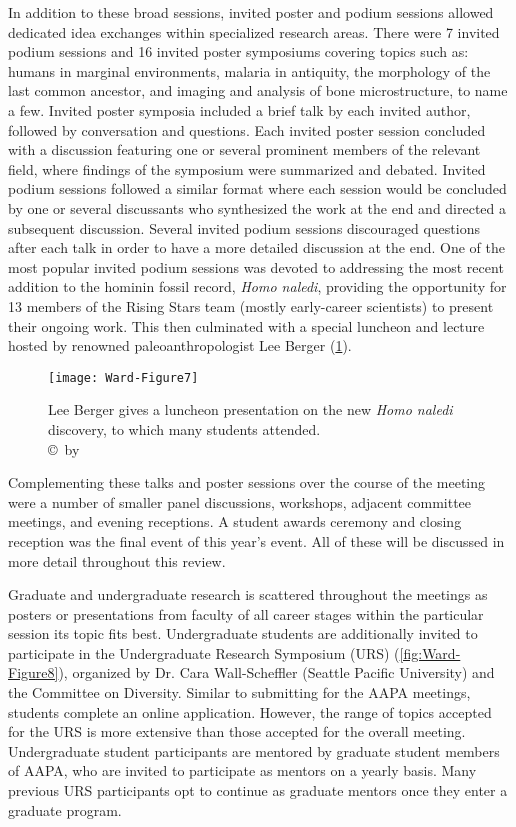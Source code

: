 \documentclass[english]{ijsra}
\begin{document}
In addition to these broad sessions, 
invited poster and podium sessions allowed dedicated idea exchanges within specialized research areas. 
There were 7 invited podium sessions and 16 invited poster symposiums covering topics such as: humans in marginal environments, 
malaria in antiquity, the morphology of the last common ancestor, and imaging and analysis of bone microstructure, to name a few. 
Invited poster symposia included a brief talk by each invited author, followed by conversation and questions. 
Each invited poster session concluded with a discussion featuring one or several prominent members of the relevant field,
where findings of the symposium were summarized and debated. 
Invited podium sessions followed a similar format where each session would be concluded by one or several discussants who synthesized
the work at the end and directed a subsequent discussion. 
Several invited podium sessions discouraged questions after each talk in order to have a more detailed discussion at the end.
One of the most popular invited podium sessions was devoted to addressing the most recent addition to the hominin fossil record,
\emph{Homo naledi}, providing the opportunity for 13 members of the Rising Stars team (mostly early-career scientists)
to present their ongoing work. 
This then culminated with a special luncheon and lecture hosted by renowned paleoanthropologist Lee Berger (\cref{fig:Ward-Figure7}).

	\begin{figure}[!htb] %
		\centering
		\texttt{[image: Ward-Figure7]}
		\caption{Lee Berger gives a luncheon presentation on the new \emph{Homo naledi} discovery, to which many students attended.
		{\normalfont\scriptsize \\ \copyright\ by \shortauthor}}
		\label{fig:Ward-Figure7}
	\end{figure}

Complementing these talks and poster sessions over the course of the meeting were a number of smaller panel discussions,
workshops, adjacent committee meetings, and evening receptions. 
A student awards ceremony and closing reception was the final event of this year’s event.  
All of these will be discussed in more detail throughout this review.

Graduate  and undergraduate research is scattered throughout the meetings as posters or presentations
from faculty of all career stages within the particular session its topic fits best. Undergraduate students are additionally invited
to participate in the Undergraduate Research Symposium (URS) (\cref{fig:Ward-Figure8}), organized by Dr. Cara Wall-Scheffler
(Seattle Pacific University) and the Committee on Diversity.  
Similar to submitting for the AAPA meetings, students complete an online application.
However, the range of topics accepted for the URS is more extensive than those accepted for the overall meeting.
Undergraduate student participants are mentored by graduate student members of AAPA,
who are invited to participate as mentors on a yearly basis.
Many previous URS participants opt to continue as graduate mentors once they enter a graduate program.
\end{document}
